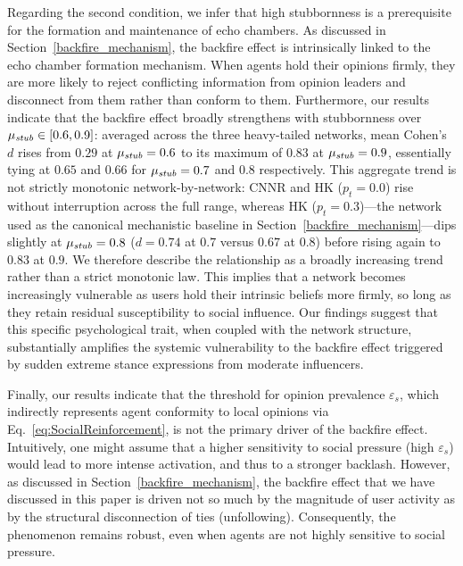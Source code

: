 \documentclass[pdflatex,sn-mathphys-num]{sn-jnl}%
\theoremstyle{thmstyleone}%
\theoremstyle{thmstyletwo}%
\theoremstyle{thmstylethree}%
\def\Stubbornness{\mu_{\it stub}}
\def\ThofOpPreval{\varepsilon_s}
\begin{document}
Regarding the second condition, we infer that
high stubbornness is a prerequisite for the
formation and maintenance of echo chambers.
As discussed in Section~\ref{backfire_mechanism},
the backfire effect is intrinsically linked
to the echo chamber formation mechanism.
When agents hold their opinions firmly,
they are more likely to reject conflicting information
from opinion leaders and disconnect from them
rather than conform to them. Furthermore, our results
indicate that the backfire effect broadly strengthens
with stubbornness over $\Stubbornness \in [0.6, 0.9]$: averaged across the
three heavy-tailed networks, mean Cohen's $d$ rises from $0.29$ at
$\Stubbornness = 0.6$ to its maximum of $0.83$ at $\Stubbornness = 0.9$,
essentially tying at $0.65$ and $0.66$ for $\Stubbornness = 0.7$ and $0.8$
respectively. This aggregate trend is not strictly monotonic
network-by-network: CNNR and HK ($p_t{=}0.0$) rise without interruption
across the full range, whereas HK ($p_t{=}0.3$)---the network used as the
canonical mechanistic baseline in Section~\ref{backfire_mechanism}---dips
slightly at $\Stubbornness = 0.8$ ($d = 0.74$ at $0.7$ versus $0.67$ at
$0.8$) before rising again to $0.83$ at $0.9$. We therefore describe the
relationship as a broadly increasing trend rather than a strict monotonic
law. This implies that a network becomes increasingly vulnerable
as users hold their intrinsic beliefs more firmly,
so long as they retain residual susceptibility to
social influence. Our findings suggest that this
specific psychological trait, when coupled with
the network structure, substantially amplifies the
systemic vulnerability to the backfire effect triggered
by sudden extreme stance expressions from moderate influencers.
\par

Finally, our results indicate that the threshold
for opinion prevalence $\ThofOpPreval$, which indirectly
represents agent conformity to local opinions via
Eq.~\eqref{eq:SocialReinforcement}, is not the primary
driver of the backfire effect. Intuitively, one might
assume that a higher sensitivity to social pressure
(high $\ThofOpPreval$) would lead to more intense
activation, and thus to a stronger backlash.
However, as discussed in Section~\ref{backfire_mechanism},
the backfire effect that we have discussed
in this paper is driven not so much by the magnitude
of user activity as by the structural
disconnection of ties (unfollowing).
Consequently, the phenomenon remains robust, even when
agents are not highly sensitive to social pressure.
\par
\end{document}

